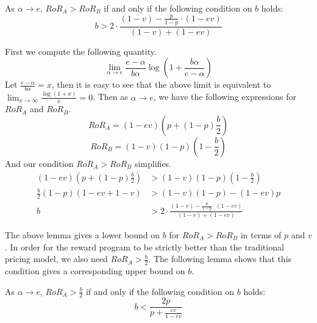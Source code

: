 \begin{lemma}
As $\alpha \rightarrow e$, $RoR_A > RoR_B$ if and only if the following condition on $b$ holds:
\begin{equation}
b > 2\cdot \frac{(1-v) - \frac{p}{1-p}\cdot (1-ev)}{(1-v) + (1-ev)}
\end{equation}
\end{lemma} 
\proof
First we compute the following quantity.
\begin{equation*}
\lim_{\alpha \to e} \frac{e-\alpha}{b\alpha}\log\left(1+\frac{b\alpha}{e-\alpha}\right)
\end{equation*}
Let $\frac{e-\alpha}{b\alpha} = x$, then it is easy to see that the above limit is equivalent to $\lim_{x\to \infty} \frac{\log(1+x)}{x} = 0$. Then as $\alpha \rightarrow e$, we have the following expressions for $RoR_A$ and $RoR_B$.
\begin{equation*}
RoR_A = (1-ev)\left(p+(1-p)\frac{b}{2} \right)
\end{equation*}
\begin{equation*}
RoR_B = (1-v)(1-p)\left(1-\frac{b}{2} \right)
\end{equation*}
And our condition $RoR_A > RoR_B$ simplifies.
\begin{align*}
(1-ev)\left(p+(1-p)\frac{b}{2} \right) &> (1-v)(1-p)\left(1-\frac{b}{2} \right) \\
\frac{b}{2}(1-p)(1-ev+1-v) &> (1-v)(1-p)-(1-ev)p \\
b &> 2\cdot \frac{(1-v) - \frac{p}{1-p}\cdot (1-ev)}{(1-v) + (1-ev)} 
\end{align*}

\endproof

The above lemma gives a lower bound on $b$ for $RoR_A > RoR_B$ in terms of $p$ and $v$. In order for the reward program to be strictly better than the traditional pricing model, we also need $RoR_A > \frac{b}{2}$. The following lemma shows that this condition gives a corresponding upper bound on $b$.

\begin{lemma}
As $\alpha \rightarrow e$, $RoR_A > \frac{b}{2}$ if and only if the following condition on $b$ holds:
\begin{equation}
b < \frac{2p}{p+\frac{ev}{1-ev}}
\end{equation}
\end{lemma} 

